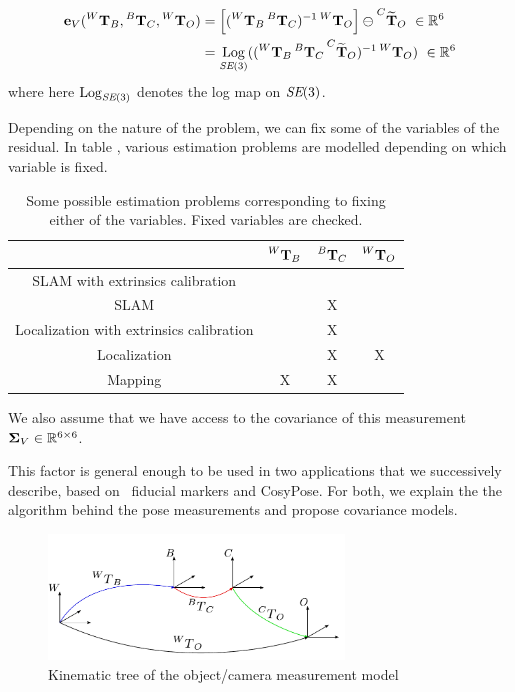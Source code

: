 \begin{align}
    {\bf e}_V (\prescript{W}{}{{\bf T}}_{B}, \prescript{B}{}{{\bf T}}_{C}, \prescript{W}{}{{\bf T}}_{O}) 
    &= \left[ (\prescript{W}{}{{\bf T}}_{B}\prescript{B}{}{{\bf T}}_{C})^{-1}\prescript{W}{}{{\bf T}}_{O} \right] \ominus \prescript{C}{}{\widetilde{{\bf T}}}_{O} ~ \in \mathbb{R}^6 \\
    &= \operatorname*{Log}_{\textit{SE}(3)} ( (\prescript{W}{}{{\bf T}}_{B} \prescript{B}{}{{\bf T}}_{C} \prescript{C}{}{\widetilde{{\bf T}}}_{O})^{-1} \prescript{W}{}{{\bf T}}_{O}) ~ \in \mathbb{R}^6
\end{align}
%
where here $\operatorname*{Log}_{\textit{SE}(3)}$ denotes the log map on $\textit{SE}(3)$.

Depending on the nature of the problem, we can fix some of the variables of the residual. In table , various estimation problems are modelled depending on which variable is fixed.

\begin{table}[h]
    \centering
    \begin{tabular}{c|c|c|c}
        & $\prescript{W}{}{{\bf T}}_{B}$ & $\prescript{B}{}{{\bf T}}_{C}$ & $\prescript{W}{}{{\bf T}}_{O}$  \\
        \hline
        \hline
        SLAM with extrinsics calibration & & & \\
        \hline
        SLAM & & X & \\
        \hline
        Localization with extrinsics calibration & & X & \\
        \hline
        Localization &  & X & X \\
        \hline
        Mapping & X & X &  \\
    \end{tabular}
    \caption{Some possible estimation problems corresponding to fixing either of the variables. Fixed variables are checked.}
    \label{tab:res_var_fix}
\end{table}



We also assume that we have access to the covariance of this measurement 
\mbox{${\bm \Sigma}_V \in \mathbb{R}^{6 \times 6}$}. 

This factor is general enough to be used in two applications that we successively describe, based on \apriltag\ fiducial markers and CosyPose. For both, we explain the
the algorithm behind the pose measurements and propose covariance models.


\begin{figure}
    \centering
    \includegraphics[width=0.7\textwidth]{figures/kin_tree_object.pdf}
    \caption{Kinematic tree of the object/camera measurement model}
    \label{fig:camera_object_chain}
\end{figure}

